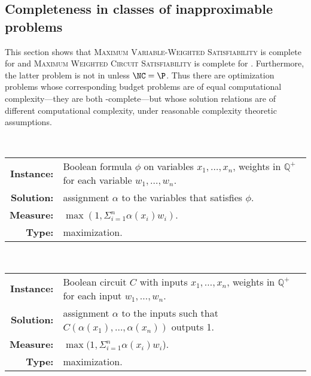 \documentclass[]{article}
\begin{document}
\subsection{Completeness in classes of inapproximable problems}

This section shows that \textsc{Maximum Variable-Weighted Satisfiability} is complete for \NNCO{} and \textsc{Maximum Weighted Circuit Satisfiability} is complete for \NPO.
Furthermore, the latter problem is not in \NNCO{} unless $\NC = \P$.
Thus there are optimization problems whose corresponding budget problems are of equal computational complexity---they are both \NP-complete---but whose solution relations are of different computational complexity, under reasonable complexity theoretic assumptions.

\begin{definition}
  \mbox{} \\
  \begin{tabular}{r p{9.5cm}}
    \textbf{Instance:} & Boolean formula $\phi$ on variables $x_1, \dotsc, x_n$, weights in $\mathbb{Q}^+$ for each variable $w_1, \dotsc, w_n$. \\
    \textbf{Solution:} & assignment $\alpha$ to the variables that satisfies $\phi$. \\
    \textbf{Measure:} & $\max(1, \Sigma_{i = 1}^n \alpha(x_i) w_i)$. \\
    \textbf{Type:} & maximization.
  \end{tabular}
\end{definition}

\begin{definition}
  \mbox{} \\
  \begin{tabular}{r p{9.5cm}}
    \textbf{Instance:} & Boolean circuit $C$ with inputs $x_1, \dotsc, x_n$, weights in $\mathbb{Q}^+$ for each input $w_1, \dotsc, w_n$. \\
    \textbf{Solution:} & assignment $\alpha$ to the inputs such that $C(\alpha(x_1), \dotsc, \alpha(x_n))$ outputs 1. \\
    \textbf{Measure:} & $\max(1, \Sigma_{i = 1}^n \alpha(x_i) w_i$). \\
    \textbf{Type:} & maximization.
  \end{tabular}
\end{definition}
\end{document}

